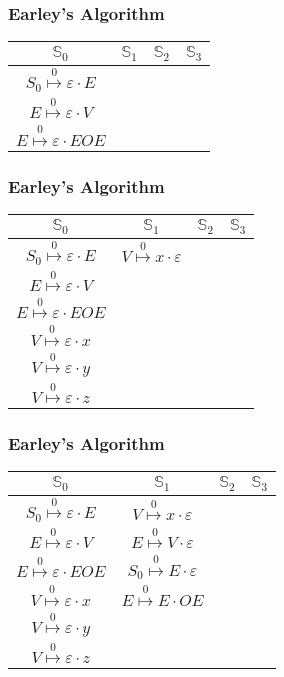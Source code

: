\documentclass{beamer}
\newcommand{\earley}[4]{#1\overset{#4}{\mapsto}#2\cdot#3}
\newcommand{\St}[1]{\mathbb{S}_{#1}}
\begin{document}
	\begin{frame}
		\frametitle{Earley's Algorithm}
		\centering
		\begin{tabular}{|c|c|c|c|}
			\hline
			$\St{0}$ & $\St{1}$ & $\St{2}$ & $\St{3}$ \\
			\hline
			$\earley{S_0}{\varepsilon}{E}{0}$ & & & \\
			$\earley{E}{\varepsilon}{V}{0}$   & & & \\
			$\earley{E}{\varepsilon}{EOE}{0}$ & & & \\
			\hline
		\end{tabular}
	\end{frame}

	\begin{frame}
		\frametitle{Earley's Algorithm}
		\centering
		\begin{tabular}{|c|c|c|c|}
			\hline
			$\St{0}$                          & $\St{1}$ & $\St{2}$ & $\St{3}$ \\
			\hline
			$\earley{S_0}{\varepsilon}{E}{0}$ & $\earley{V}{x}{\varepsilon}{0}$ & &\\
			$\earley{E}{\varepsilon}{V}{0}$   & & & \\
			$\earley{E}{\varepsilon}{EOE}{0}$ & & & \\
			$\earley{V}{\varepsilon}{x}{0}$   & & & \\
			$\earley{V}{\varepsilon}{y}{0}$   & & & \\
			$\earley{V}{\varepsilon}{z}{0}$   & & & \\
			\hline
		\end{tabular}
	\end{frame}

	\begin{frame}
		\frametitle{Earley's Algorithm}
		\centering
		\begin{tabular}{|c|c|c|c|}
			\hline
			$\St{0}$                          & $\St{1}$ & $\St{2}$ & $\St{3}$ \\
			\hline
			$\earley{S_0}{\varepsilon}{E}{0}$ & $\earley{V}{x}{\varepsilon}{0}$   &  & \\
			$\earley{E}{\varepsilon}{V}{0}$   & $\earley{E}{V}{\varepsilon}{0}$   &  & \\
			$\earley{E}{\varepsilon}{EOE}{0}$ & $\earley{S_0}{E}{\varepsilon}{0}$ &  & \\
			$\earley{V}{\varepsilon}{x}{0}$   & $\earley{E}{E}{OE}{0}$            &  & \\
			$\earley{V}{\varepsilon}{y}{0}$   &                                   &  & \\
			$\earley{V}{\varepsilon}{z}{0}$   &                                   &  & \\
			\hline
		\end{tabular}
	\end{frame}
\end{document}
